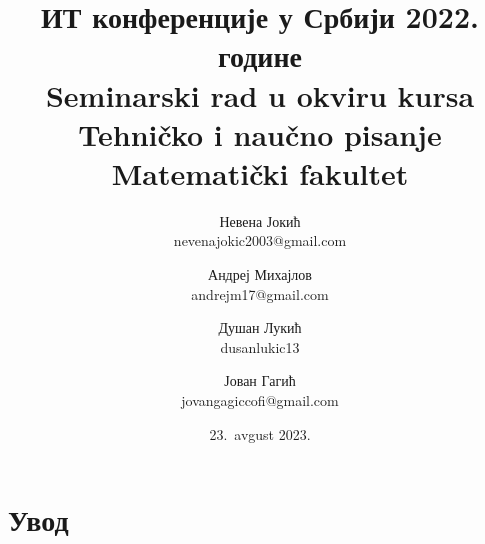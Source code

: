 \documentclass[12pt]{article}
\begin{document}
\title{ИТ конференције у Србији 2022. године\\ \small{Seminarski rad u okviru kursa\\Tehničko i naučno pisanje\\ Matematički fakultet}}
\author{Невена Јокић\\ nevenajokic2003@gmail.com \and Андреј Михајлов\\ andrejm17@gmail.com \and Душан Лукић\\ dusanlukic13 \and Јован Гагић\\ jovangagiccofi@gmail.com}
\date{23.~avgust 2023.}
\maketitle
{}

\newpage

\tableofcontents
\newpage

\section{Увод}
\end{document}
